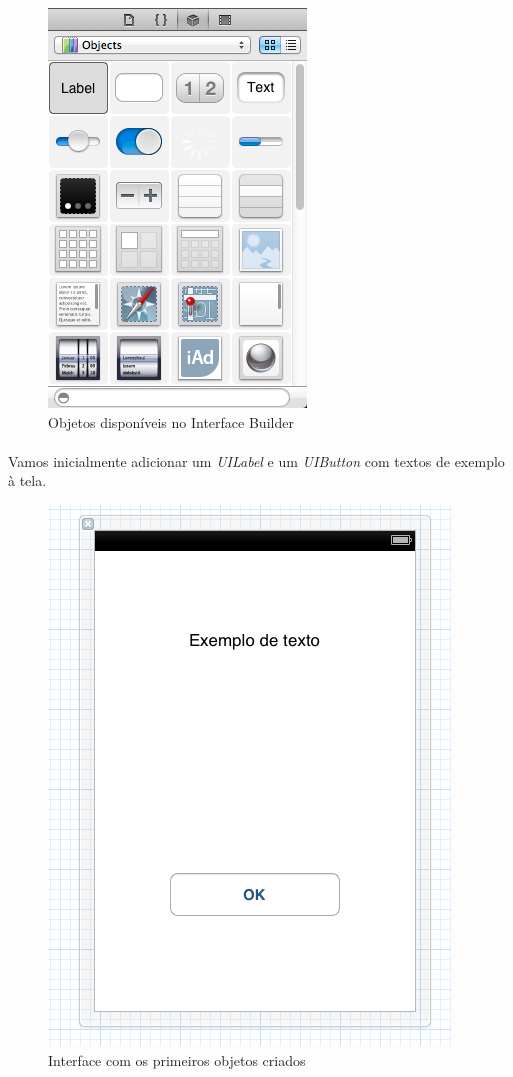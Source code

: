 \documentclass[a4paper,12pt,brazil,doubleside]{book}
\begin{document}
\begin{figure}[h]
  \centering
  \includegraphics[totalheight=0.4\textheight]{../figuras/ios/1/xib_objetos.png}
  \caption{Objetos disponíveis no Interface Builder}
  \label{fig:a}
\end{figure}

\bigskip

\paragraph{}Vamos inicialmente adicionar um \emph{UILabel} e um \emph{UIButton} com textos de exemplo à tela.

\begin{figure}[h]
  \centering
  \includegraphics[totalheight=0.25\textheight]{../figuras/ios/1/xib_tela1.png}
  \caption{Interface com os primeiros objetos criados}
  \label{fig:a}
\end{figure}
\end{document}
